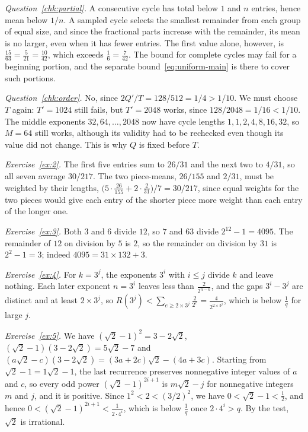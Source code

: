 \documentclass[10pt]{article}
\theoremstyle{plain}
\theoremstyle{definition}
\theoremstyle{remark}
\begin{document}
\emph{Question~\ref{chk:partial}.} A consecutive cycle has total below
$1$ and $n$ entries, hence mean below $1/n$. A sampled cycle selects the
smallest remainder from each group of equal size, and since the
fractional parts increase with the remainder, its mean is no larger,
even when it has fewer entries. The first value alone, however, is
$\tfrac{15}{63}=\tfrac5{21}=\tfrac{10}{42}$, which exceeds
$\tfrac16=\tfrac7{42}$. The bound for complete cycles may fail for a
beginning portion, and the separate bound~\eqref{eq:uniform-main} is
there to cover such portions.

\emph{Question~\ref{chk:order}.} No, since
$2Q'/T=128/512=1/4>1/10$. We must choose $T$ again: $T'=1024$ still
fails, but $T'=2048$ works, since $128/2048=1/16<1/10$. The middle
exponents $32,64,\dots,2048$ now have cycle lengths $1,1,2,4,8,16,32$,
so $M=64$ still works, although its validity had to be rechecked even
though its value did not change. This is why $Q$ is fixed before $T$.

\emph{Exercise~\ref{ex:2}.} The first five entries sum to $26/31$ and
the next two to $4/31$, so all seven average $30/217$. The two
piece-means, $26/155$ and $2/31$, must be weighted by their lengths,
$\bigl(5\cdot\tfrac{26}{155}+2\cdot\tfrac2{31}\bigr)/7=30/217$, since
equal weights for the two pieces would give each entry of the shorter
piece more weight than each entry of the longer one.

\emph{Exercise~\ref{ex:3}.} Both $3$ and $6$ divide $12$, so $7$ and
$63$ divide $2^{12}-1=4095$. The remainder of $12$ on division by $5$ is
$2$, so the remainder on division by $31$ is $2^2-1=3$; indeed
$4095=31\times132+3$.

\emph{Exercise~\ref{ex:4}.} For $k=3^j$, the exponents $3^i$ with
$i\le j$ divide $k$ and leave nothing. Each later exponent $n=3^i$
leaves less than $\tfrac2{2^{n-k}}$, and the gaps $3^i-3^j$ are
distinct and at least $2\times3^j$, so $R(3^j)<\sum_{e\ge2\times3^j}\tfrac2{2^e}=\tfrac4{2^{2\times3^j}}$,
which is below $\tfrac1q$ for large $j$.

\emph{Exercise~\ref{ex:5}.} We have $(\sqrt2-1)^2=3-2\sqrt2$,
$(\sqrt2-1)(3-2\sqrt2)=5\sqrt2-7$ and
$(a\sqrt2-c)(3-2\sqrt2)=(3a+2c)\sqrt2-(4a+3c)$. Starting from
$\sqrt2-1=1\sqrt2-1$, the last recurrence preserves nonnegative integer
values of $a$ and $c$, so every odd power $(\sqrt2-1)^{2i+1}$ is
$m\sqrt2-j$ for nonnegative integers $m$ and $j$, and it is positive.
Since $1^2<2<(3/2)^2$, we have $0<\sqrt2-1<\tfrac12$, and hence
$0<(\sqrt2-1)^{2i+1}<\tfrac1{2\cdot4^i}$, which is below $\tfrac1q$ once
$2\cdot4^i>q$. By the test, $\sqrt2$ is irrational.
\end{document}
